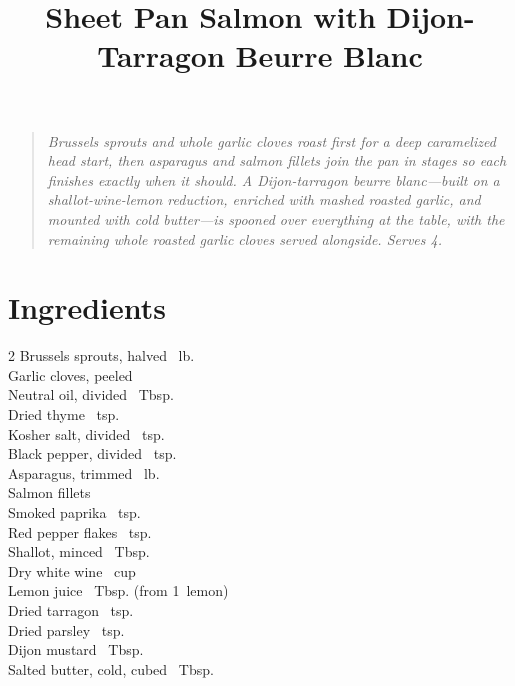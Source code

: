 \documentclass[11pt,letterpaper]{article}
\title{Sheet Pan Salmon with Dijon-Tarragon Beurre Blanc}
\author{}
\date{}
\begin{document}
\maketitle
\thispagestyle{empty}

\begin{quote}\textit{Brussels sprouts and whole garlic cloves roast first for a deep caramelized head start, then asparagus and salmon fillets join the pan in stages so each finishes exactly when it should. A Dijon-tarragon beurre blanc---built on a shallot-wine-lemon reduction, enriched with mashed roasted garlic, and mounted with cold butter---is spooned over everything at the table, with the remaining whole roasted garlic cloves served alongside. Serves 4.}\end{quote}

\section*{Ingredients}
\setlength{\columnsep}{20pt}
\begin{multicols}{2}
\noindent
    Brussels sprouts, halved ~lb. \\
    Garlic cloves, peeled  \\
    Neutral oil, divided ~Tbsp. \\
    Dried thyme ~tsp. \\
    Kosher salt, divided ~tsp. \\
    Black pepper, divided ~tsp. \\
    Asparagus, trimmed ~lb. \\
    Salmon fillets  \\
    \columnbreak
    Smoked paprika \dotfill {}~tsp. \\
    Red pepper flakes \dotfill {}~tsp. \\
    Shallot, minced ~Tbsp. \\
    Dry white wine \dotfill {}~cup \\
    Lemon juice ~Tbsp. (from 1~lemon) \\
    Dried tarragon ~tsp. \\
    Dried parsley ~tsp. \\
    Dijon mustard ~Tbsp. \\
    Salted butter, cold, cubed ~Tbsp. \\
\end{multicols}
\end{document}
